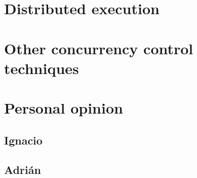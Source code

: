 \documentclass[a4paper, 10pt]{article}
\begin{document}
\clearpage
\section{Distributed execution}

\clearpage
\section{Other concurrency control techniques}

\clearpage
\section{Personal opinion}

\subsection{Ignacio}

\subsection{Adrián}
\end{document}
